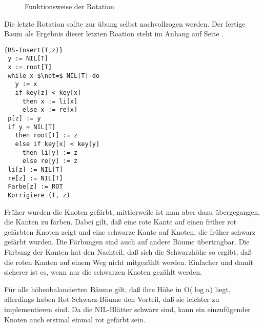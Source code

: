 \documentclass[ngerman,draft,parskip=half*,twoside]{scrreprt}
\theoremstyle{break}
\begin{document}
\begin{figure}[H]
\centering
\hspace{5mm}

\caption{Funktionsweise der Rotation}
\end{figure}
Die letzte Rotation sollte zur übung selbst nachvollzogen werden. Der fertige Baum als Ergebnis dieser letzten Roation steht im Anhang
auf Seite \pageref{rsrotation}.

\begin{Algorithmus}[H]
\begin{lstlisting}[frame=tlrb, mathescape=true, title=\textsc{RS-Insert\textnormal{(T, z)}}, gobble=1]{RS-Insert(T,z)}
 y := NIL[T]
 x := root[T]
 while x $\not=$ NIL[T] do
   y := x
   if key[z] < key[x]
     then x := li[x]
     else x := re[x]
 p[z] := y
 if y = NIL[T]
   then root[T] := z
   else if key[x] < key[y]
     then li[y] := z
     else re[y] := z
 li[z] := NIL[T]
 re[z] := NIL[T]
 Farbe[z] := ROT
 Korrigiere (T, z)
\end{lstlisting}
\end{Algorithmus}

Früher wurden die Knoten gefärbt, mittlerweile ist man aber dazu übergegangen, die Kanten zu färben. Dabei gilt, daß eine rote
Kante auf einen früher rot gefärbten Knoten zeigt und eine schwarze Kante auf Knoten, die früher schwarz gefärbt
wurden. Die Färbungen sind auch auf andere Bäume übertragbar. Die Färbung der Kanten hat den Nachteil, daß sich die Schwarzhöhe so
ergibt, daß die roten Kanten auf einem Weg nicht mitgezählt werden. Einfacher und damit sicherer ist es, wenn nur die schwarzen Knoten
gezählt werden.

Für alle höhenbalancierten Bäume gilt, daß ihre Höhe in O($\log n$) liegt, allerdings haben Rot-Schwarz-Bäume den Vorteil, daß
sie leichter zu implementieren sind. Da die NIL-Blätter schwarz sind, kann ein einzufügender Knoten auch erstmal einmal rot gefärbt
sein.

\end{document}
